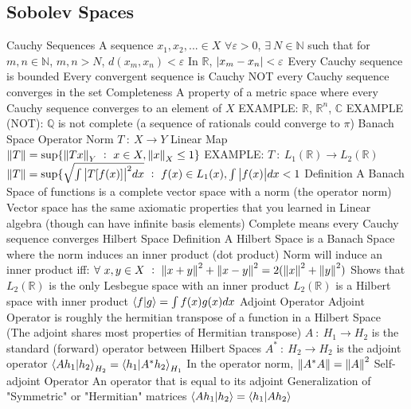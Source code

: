 \documentclass[14pt]{extarticle}
\begin{document}
\begin{outline}
		\section*{Sobolev Spaces}
			\1	Cauchy Sequences
				\2	A sequence $x_1,x_2,... \in X$
				\2	$\forall \varepsilon > 0$, $\exists~N \in \mathbb{N}$ such that for
						$m,n \in \mathbb{N}$, $m,n > N$, $d(x_m,x_n) < \varepsilon$
				\2	In $\mathbb{R}$, $\abs{x_m - x_n} < \varepsilon$
				\2	Every Cauchy sequence is bounded
				\2	Every convergent sequence is Cauchy
				\2	NOT every Cauchy sequence converges in the set
				\2	Completeness
					\3	A property of a metric space where every Cauchy sequence converges
							to an element of $X$
					\3	EXAMPLE:	$\mathbb{R}$, $\mathbb{R}^n$, $\mathbb{C}$
					\3	EXAMPLE (NOT): $\mathbb{Q}$ is not complete (a sequence of rationals
							could converge to $\pi$)
			\1	Banach Space
				\2	Operator Norm
					\3	$T~:~X \rightarrow Y$ Linear Map
					\3	$\norm{T} = \sup\{\norm{Tx}_Y~:~x \in X, \norm{x}_X \le 1\}$
					\3	EXAMPLE: $T~:~L_1(\mathbb{R}) \rightarrow L_2(\mathbb{R})$
						\4	$\norm{T} = \sup\{\sqrt{\int \abs{T[f(x)]}^2 dx}~:~f(x) \in L_1(x),
									\int \abs{f(x)} dx < 1$
				\2	Definition
					\3	A Banach Space of functions is a complete vector space with a norm (the operator norm)
					\3	Vector space has the same axiomatic properties that you learned in Linear algebra
							(though can have infinite basis elements)
					\3	Complete means every Cauchy sequence converges
			\1	Hilbert Space
				\2	Definition
					\3	A Hilbert Space is a Banach Space where the norm induces an 
							inner product (dot product)
					\3	Norm will induce an inner product iff:
						\4	$\forall~x,y \in X~:~\norm{x+y}^2 + \norm{x-y}^2 = 2(\norm{x}^2+\norm{y}^2)$
						\4	Shows that $L_2(\mathbb{R})$ is the only Lesbegue space with an
								inner product
						\4	$L_2(\mathbb{R})$ is a Hilbert space with inner product
								$\braket{f}{g} = \int f(x)g(x) dx$
				\2	Adjoint Operator
					\3	Adjoint Operator is roughly the hermitian transpose of a function
							in a Hilbert Space (The adjoint shares most properties of Hermitian transpose)
					\3	$A~:~H_1 \rightarrow H_2$ is the standard (forward) operator between Hilbert Spaces
					\3	$A^*~:~H_2 \rightarrow H_2$ is the adjoint operator
					\3	$\braket{Ah_1}{h_2}_{H_2} = \braket{h_1}{A^*h_2}_{H_1}$
					\3	In the operator norm, $\norm{A^*A} = \norm{A}^2$
				\2	Self-adjoint Operator
					\3	An operator that is equal to its adjoint
					\3	Generalization of "Symmetric" or "Hermitian" matrices
					\3	$\braket{Ah_1}{h_2} = \braket{h_1}{Ah_2}$

\end{outline}
\end{document}
